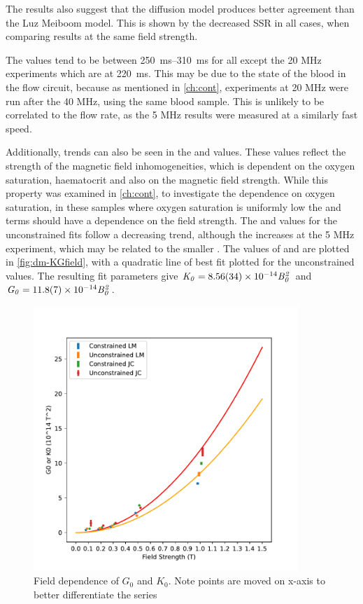 The results also suggest that the diffusion model produces better agreement than the Luz Meiboom model.
This is shown by the decreased SSR in all cases, when comparing results at the same field strength.

The \TtwoO values tend to be between \SIrange{250}{310}{ms} for all except the 20 MHz experiments which are at \SI{220}{ms}.
This may be due to the state of the blood in the flow circuit, because as mentioned in \autoref{ch:cont}, experiments at 20 MHz were run after the 40 MHz, using the same blood sample.
This is unlikely to be correlated to the flow rate, as the 5 MHz results were measured at a similarly fast speed.

Additionally, trends can also be seen in the \Kzero and \Gzero values.
These values reflect the strength of the magnetic field inhomogeneities, which is dependent on the oxygen saturation, haematocrit and also on the magnetic field strength.
While this property was examined in \autoref{ch:cont}, to investigate the dependence on oxygen saturation, in these samples where oxygen saturation is uniformly low the \Kzero and \Gzero terms should have a dependence on the field strength.
The \Kzero and \Gzero values for the unconstrained fits follow a decreasing trend, although the \Gzero increases at the 5 MHz experiment, which may be related to the smaller \rc.
The values of \Kzero and \Gzero are plotted in \autoref{fig:dm-KGfield}, with a quadratic line of best fit plotted for the unconstrained \Kzero values. The resulting fit parameters give
 $\mathit{K_0=\num{8.56\pm0.34e-14}B_0^2}$ and $\mathit{G_0 = \num{11.8\pm0.7e-14}B_0^2}$.
\begin{figure}[h]
\centering
\includegraphics[width=10cm]{figures/diffmodels/G0K0field.pdf}
\caption[Field dependence of $G_0$ and $K_0$]{Field dependence of $G_0$ and $K_0$. Note points are moved on x-axis to better differentiate the series}
\label{fig:dm-KGfield}
\end{figure}

